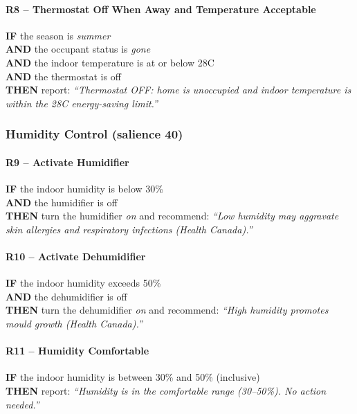 \documentclass{article}
\begin{document}
\paragraph{R8 -- Thermostat Off When Away and Temperature Acceptable}
\textbf{IF} the season is \emph{summer} \\
\textbf{AND} the occupant status is \emph{gone} \\
\textbf{AND} the indoor temperature is at or below 28\textdegree C \\
\textbf{AND} the thermostat is off \\
\textbf{THEN} report: \textit{``Thermostat OFF: home is unoccupied and indoor temperature is within the 28\textdegree C energy-saving limit.''}

\subsubsection{Humidity Control \textnormal{\small(salience 40)}}

\paragraph{R9 -- Activate Humidifier}
\textbf{IF} the indoor humidity is below 30\% \\
\textbf{AND} the humidifier is off \\
\textbf{THEN} turn the humidifier \emph{on} and recommend: \textit{``Low humidity may aggravate skin allergies and respiratory infections (Health Canada).''}

\paragraph{R10 -- Activate Dehumidifier}
\textbf{IF} the indoor humidity exceeds 50\% \\
\textbf{AND} the dehumidifier is off \\
\textbf{THEN} turn the dehumidifier \emph{on} and recommend: \textit{``High humidity promotes mould growth (Health Canada).''}

\paragraph{R11 -- Humidity Comfortable}
\textbf{IF} the indoor humidity is between 30\% and 50\% (inclusive) \\
\textbf{THEN} report: \textit{``Humidity is in the comfortable range (30--50\%). No action needed.''}
\end{document}
